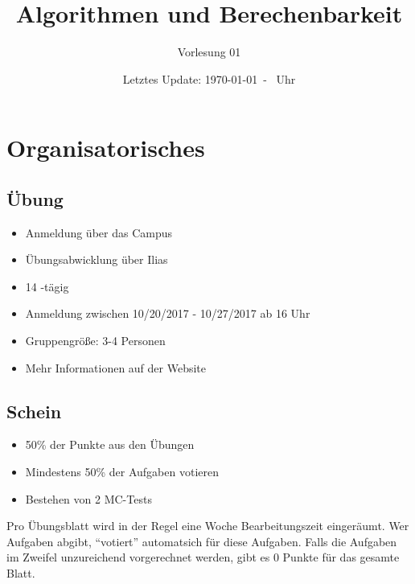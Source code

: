 \documentclass{scrartcl}%
\begin{document}
    \subject{Vorlesungsmitschrieb}
    \title{Algorithmen und Berechenbarkeit}
    \subtitle{Vorlesung 01}
    \date{Letztes Update: \today \ - \currenttime \ Uhr}
    \maketitle
    \section*{Organisatorisches}
    \label{sec:organisatorisches}

    \subsection*{Übung}
    \label{subsec:übung}

    \begin{itemize}
        \item Anmeldung über das Campus
        \item Übungsabwicklung über Ilias
        \item 14 -tägig
        \item Anmeldung zwischen 10/20/2017 - 10/27/2017 ab 16 Uhr
        \item Gruppengröße: 3-4 Personen
        \item Mehr Informationen auf der Website
    \end{itemize}

    \subsection*{Schein}
    \label{subsec:schein}

    \begin{itemize}
        \item 50\% der Punkte aus den Übungen
        \item Mindestens 50\% der Aufgaben votieren
        \item Bestehen von 2 MC-Tests
    \end{itemize}

    Pro Übungsblatt wird in der Regel eine Woche Bearbeitungszeit eingeräumt.
    Wer Aufgaben abgibt, "`votiert"' automatsich für diese Aufgaben.
    Falls die Aufgaben im Zweifel unzureichend vorgerechnet werden,
    gibt es 0 Punkte für das gesamte Blatt.
\end{document}
